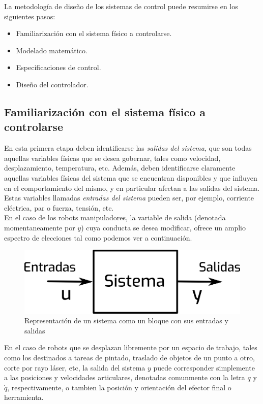La metodología de diseño de los sistemas de control puede resumirse en los siguientes pasos:

\begin{itemize}
	\item Familiarización con el sistema físico a controlarse.
	\item Modelado matemático.
	\item Especificaciones de control.
	\item Diseño del controlador.
\end{itemize}

\subsection{Familiarización con el sistema físico a controlarse}

En esta primera etapa deben identificarse las \textit{salidas del sistema}, que son todas aquellas variables físicas que se desea gobernar, tales como velocidad, desplazamiento, temperatura, etc. Además, deben identificarse claramente aquellas variables físicas del sistema que se encuentran disponibles y que influyen en el comportamiento del mismo, y en particular afectan a las salidas del sistema. Estas variables llamadas \textit{entradas del sistema} pueden ser, por ejemplo, corriente eléctrica, par o fuerza, tensión, etc.\\

En el caso de los robots manipuladores, la variable de salida (denotada momentaneamente por $\boldsymbol{\mathit{y}}$) cuya conducta se desea modificar, ofrece un amplio espectro de elecciones tal como podemos ver a continuación.\\

\begin{figure}[h!]
	\centering
	\includegraphics[scale=0.3]{Capitulo3/figs/diagSis.png} 
	\caption{Representación de un sistema como un bloque con sus entradas y salidas}
	\label{dSis}
\end{figure}

En el caso de robots que se desplazan libremente por un espacio de trabajo, tales como los destinados a tareas de pintado, traslado de objetos de un punto a otro, corte por rayo láser, etc, la salida del sistema $\boldsymbol{\mathit{y}}$ puede corresponder simplemente a las posiciones y velocidades articulares, denotadas comunmente con la letra $\boldsymbol{\mathit{q}}$ y  $\boldsymbol{\mathit{\dot{q}}}$, respectivamente, o tambien la posición y orientación del efector final o herramienta.\\

